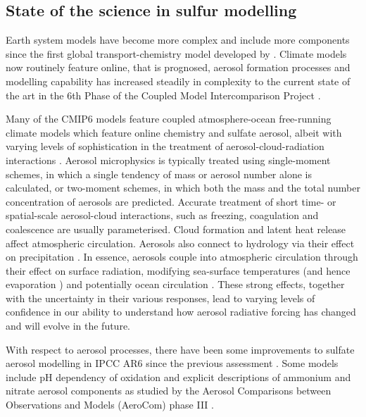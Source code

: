 \subsection{State of the science in sulfur modelling}

Earth system models have become more complex and include more components since the first global transport-chemistry model developed by \citet{langnerGlobalThreedimensionalModel1991}. Climate models now routinely feature online, that is prognosed, aerosol formation processes and modelling capability has increased steadily in complexity to the current state of the art in the 6th Phase of the Coupled Model Intercomparison Project \citep[CMIP6, details in next section;][]{eyringOverviewCoupledModel2016}. 


Many of the CMIP6 models feature coupled atmosphere-ocean free-running climate models which feature online chemistry and sulfate aerosol, albeit with varying levels of sophistication in the treatment of aerosol-cloud-radiation interactions \citep[e.g.][]{zhangBCCESM1ModelDatasets2021, vannoijeECEarth3AerChemGlobalClimate2021, mulcahyDescriptionEvaluationAerosol2020}.  Aerosol microphysics is typically treated using single-moment schemes, in which a single tendency of mass or aerosol number alone is calculated, or two-moment schemes, in which both the mass and the total number concentration of aerosols are predicted.  Accurate treatment of short time- or spatial-scale aerosol-cloud interactions, such as freezing, coagulation and coalescence are usually parameterised. Cloud formation and latent heat release affect atmospheric circulation.  Aerosols also connect to hydrology via their effect on precipitation \citep{allenInterhemisphericAerosolRadiative2015}. In essence, aerosols couple into atmospheric circulation through their effect on surface radiation, modifying sea-surface temperatures (and hence evaporation \citep{boothAerosolsImplicatedPrime2012}) and potentially ocean circulation \citep{cowanResponseLargescaleOcean2013}. These strong effects, together with the uncertainty in their various responses, lead to varying levels of confidence in our ability to understand how aerosol radiative forcing has changed and will evolve in the future.


With respect to aerosol processes, there have been some improvements to sulfate aerosol modelling in IPCC AR6 since the previous assessment \citep{forsterEarthEnergyBudget2021}. Some models include pH dependency of  oxidation \citep[such as the NorESM1;][]{kirkevagProductiontaggedAerosolModule2018} and explicit descriptions of ammonium and nitrate aerosol components as studied by the Aerosol Comparisons between Observations and Models (AeroCom) phase III \citep{bianInvestigationGlobalParticulate2017}.


